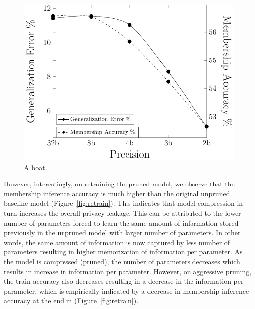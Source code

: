 \begin{figure}
  \includegraphics[width=0.7\columnwidth]{figures/fmnist_wtsharing.pdf}
  \caption{A boat.}
  \label{fig:wtsharing}
\end{figure}



However, interestingly, on retraining the pruned model, we observe that the membership inference accuracy is much higher than the original unpruned baseline model (Figure~\ref{fig:retrain}).
This indicates that model compression in turn increases the overall privacy leakage.
This can be attributed to the lower number of parameters forced to learn the same amount of information stored previously in the unpruned model with larger number of parameters.
In other words, the same amount of information is now captured by less number of parameters resulting in higher memorization of information per parameter.
As the model is compressed (pruned), the number of parameters decreases which results in increase in information per parameter. However, on aggressive pruning, the train accuracy also decreases resulting in a decrease in the information per parameter, which is empirically indicated by a decrease in membership inference accuracy at the end in (Figure~\ref{fig:retrain}).



